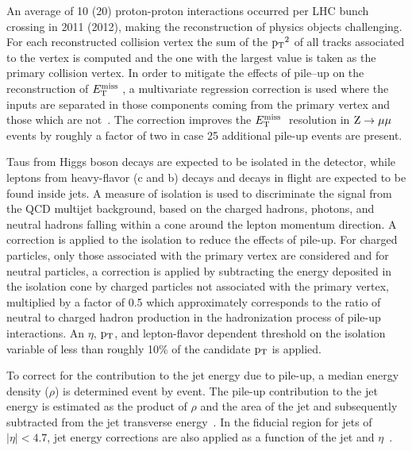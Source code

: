 An average of 10 (20) proton-proton interactions occurred per LHC bunch crossing in 2011 (2012), making the reconstruction of physics objects challenging. For each reconstructed collision vertex the sum of the $\mathrm{p_{T}}^2$ of all tracks associated to the vertex is computed and the one with the largest value is taken as the primary collision vertex. In order to mitigate the effects of pile--up on the reconstruction of $E_\mathrm{T}^{\mathrm{miss}}\;$, a multivariate regression correction is used where the inputs are separated in those components coming from the primary vertex and those which are not~\cite{CMS-PAS-JME-12-002}. 
The correction improves the $E_\mathrm{T}^{\mathrm{miss}}\;$ resolution in $\mathrm{Z}\rightarrow\mathrm{\mu}\mathrm{\mu}$ events by roughly a factor of two in case 25 additional pile-up events are present. 

Taus from Higgs boson decays are expected to be isolated in the detector, while leptons from 
heavy-flavor (c and b) decays and decays in flight are expected to be found inside jets. A 
measure of isolation is used to discriminate the signal from the QCD multijet background, 
based on the charged hadrons, photons, and neutral hadrons falling within a cone around the 
lepton momentum direction.
A correction is applied to the isolation to reduce the effects of pile-up. For charged particles, 
only those associated with the primary vertex are considered and for neutral particles, a 
correction is applied by subtracting the energy deposited in the isolation cone by charged 
particles not associated with the primary vertex, multiplied by a factor of 0.5 which 
approximately corresponds to the ratio of neutral to charged hadron production in the 
hadronization process of pile-up interactions. An $\eta$, $\mathrm{p_{T}}$, and lepton-flavor dependent 
threshold on the isolation variable of less than roughly 10\% of the candidate $\mathrm{p_{T}}$ is applied.

To correct for the contribution to the jet energy due to pile-up, a median energy density ($\rho$) is determined event by event. The pile-up contribution to the jet energy is estimated as the product of $\rho$ and the area of the jet and subsequently subtracted from the jet transverse energy~\cite{Cacciari:subtraction}. In the fiducial region for jets of $|\eta| < 4.7$, jet energy corrections are also applied as a function of the jet \ET and $\eta$~\cite{cmsJEC}.


